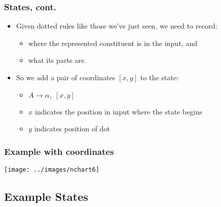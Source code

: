 

\begin{frame}[fragile]
  \frametitle{States, cont.}


  \begin{itemize}
    
  \item Given dotted rules like those we've just seen, we need to record:

    \begin{itemize}
    \item where the represented constituent is in the input, and
    \item what its parts are.
    \end{itemize}

  \item So we add a pair of coordinates $[x,y]$ to the state:

\begin{itemize}
  
  \item $A \rightarrow \alpha , \; [x,y] $
  \item $x$ indicates the position in input where the state begins
  \item $y$ indicates position of dot
  \end{itemize}
\end{itemize}

\end{frame}



\begin{frame}[fragile]
\frametitle{Example with coordinates}


\begin{center}
\texttt{[image: ../images/nchart6]}  
\end{center}
\end{frame}

\subsection{Example States}


